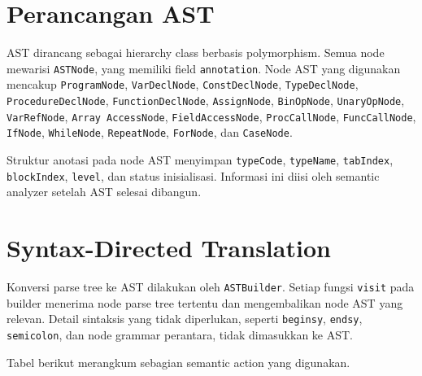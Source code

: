 \section{Perancangan AST}
AST dirancang sebagai hierarchy class berbasis polymorphism. Semua node mewarisi \texttt{ASTNode}, yang memiliki field \texttt{annotation}. Node AST yang digunakan mencakup \texttt{ProgramNode}, \texttt{VarDeclNode}, \texttt{ConstDeclNode}, \texttt{TypeDeclNode}, \texttt{ProcedureDeclNode}, \texttt{FunctionDeclNode}, \texttt{AssignNode}, \texttt{BinOpNode}, \texttt{UnaryOpNode}, \texttt{VarRefNode}, \texttt{Array AccessNode}, \texttt{FieldAccessNode}, \texttt{ProcCallNode}, \texttt{FuncCallNode}, \texttt{IfNode}, \texttt{WhileNode}, \texttt{RepeatNode}, \texttt{ForNode}, dan \texttt{CaseNode}.

Struktur anotasi pada node AST menyimpan \texttt{typeCode}, \texttt{typeName}, \texttt{tabIndex}, \texttt{blockIndex}, \texttt{level}, dan status inisialisasi. Informasi ini diisi oleh semantic analyzer setelah AST selesai dibangun.

\section{Syntax-Directed Translation}
Konversi parse tree ke AST dilakukan oleh \texttt{ASTBuilder}. Setiap fungsi \texttt{visit} pada builder menerima node parse tree tertentu dan mengembalikan node AST yang relevan. Detail sintaksis yang tidak diperlukan, seperti \texttt{beginsy}, \texttt{endsy}, \texttt{semicolon}, dan node grammar perantara, tidak dimasukkan ke AST.

Tabel berikut merangkum sebagian semantic action yang digunakan.

